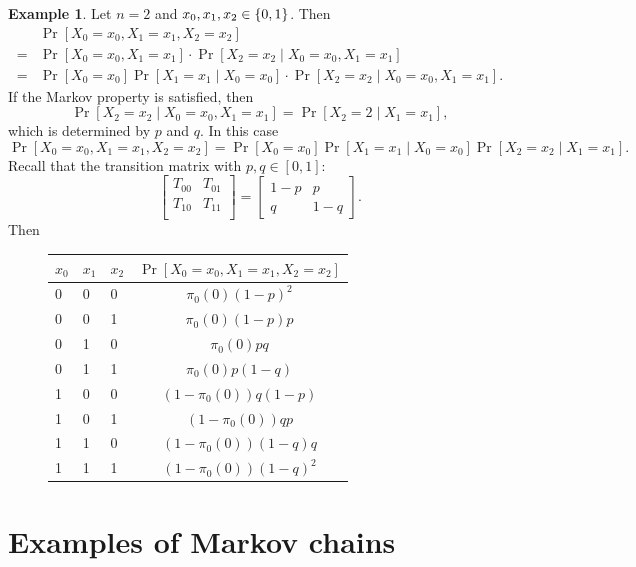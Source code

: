\documentclass[12pt,openany]{book}
\theoremstyle{definition}
\newtheorem{example}{Example}[chapter]
\begin{document}
	\newpage
	\begin{example}
		Let $n=2$ and $x_0,x_1,x_2\in\set{0,1}$. Then \begin{align*}
			&\Pr[X_0=x_0,X_1=x_1,X_2=x_2]\\=&
			\Pr[X_0=x_0,X_1=x_1]\cdot\Pr[X_2=x_2\mid X_0=x_0,X_1=x_1]\\=&
			\Pr[X_0=x_0]\Pr[X_1=x_1\mid X_0=x_0]\cdot\Pr[X_2=x_2\mid X_0=x_0,X_1=x_1].
		\end{align*} If the Markov property is satisfied, then \[
		\Pr[X_2=x_2\mid X_0=x_0,X_1=x_1]=\Pr[X_2=2\mid X_1=x_1],
	\] which is determined by $p$ and $q$. In this case \[
	\Pr[X_0=x_0,X_1=x_1,X_2=x_2]=\Pr[X_0=x_0]\Pr[X_1=x_1\mid X_0=x_0]\Pr[X_2=x_2\mid X_1=x_1].
	\] Recall that the transition matrix with $p,q\in[0,1]$: \[
	\begin{bmatrix}
		T_{00} & T_{01}\\
		T_{10} & T_{11}\\
	\end{bmatrix}=\begin{bmatrix}
		1-p & p\\
		q & 1-q
	\end{bmatrix}.
	\] Then \begin{figure}[h!]\centering\renewcommand*{\arraystretch}{1.4}
		\begin{tabularx}{\textwidth}{XXX|c}
			\toprule[1.2pt]
			$x_0$ &$x_1$& $x_2$ & $\Pr[X_0=x_0,X_1=x_1,X_2=x_2]$\\
			\midrule
			0& 0& 0     &$\pi_0(0)(1-p)^2$\\
			\hline
			0& 0& 1     &$\pi_0(0)(1-p)p$\\
			\hline
			0& 1& 0     &$\pi_0(0)pq$\\
			\hline
			0& 1& 1     &$\pi_0(0)p(1-q)$\\
			\hline
			\hline
			1& 0& 0     &$(1-\pi_0(0))q(1-p)$\\
			\hline
			1& 0& 1     &$(1-\pi_0(0))qp$\\
			\hline
			1& 1& 0     &$(1-\pi_0(0))(1-q)q$\\
			\hline
			1& 1& 1     &$(1-\pi_0(0))(1-q)^2$\\
			\bottomrule[1.2pt]
		\end{tabularx}
	\end{figure}
	\end{example}

	\newpage
	\chapter{Examples of Markov chains}
	
\end{document}
